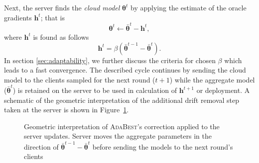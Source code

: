 \documentclass[runningheads]{llncs}
\def\figref#1{Figure~\ref{#1}}
\def\vtheta{{\bm{\theta}}}
\def\vg{{\bm{g}}}
\def\vh{{\bm{h}}}
\newcommand*\mean[1]{\bar{#1}}
\newcommand{\ours}{\textsc{AdaBest}\xspace}
\begin{document}
\noindent Next, the server finds the \emph{cloud model} ${\vtheta}^t$ by applying the estimate of the oracle gradients $\vh^t$; that is 
\begin{equation}
    \vtheta^t \leftarrow \bar{\vtheta}^t - \vh^t,
    \label{eq:theta}
\end{equation}
where $\vh^t$ is found as follows
\begin{equation}
    \vh^t=\beta(\bar{\vtheta}^{t-1}-\bar{\vtheta}^t).
    \label{eq:gt}
\end{equation}
In section \ref{sec:adaptability}, we further discuss the criteria for chosen $\beta$ which leads to a fast convergence.
The described cycle continues by sending the cloud model to the clients sampled for the next round ($t+1$) while the aggregate model ($\bar{\vtheta}^t$) is retained on the server to be used in calculation of $\vh^{t+1}$ or deployment.
A schematic of the geometric interpretation of the additional drift removal step taken at the server is shown in \figref{fig:geometric_int}.
\begin{figure}
\centering
{}
\caption{Geometric interpretation of \ours's correction applied to the server updates. Server moves the aggregate parameters in the direction of $\mean{\vtheta}^{t-1} - \mean{\vtheta}^{t}$ before sending the models to the next round's clients}
\label{fig:geometric_int}
\end{figure}
\end{document}
